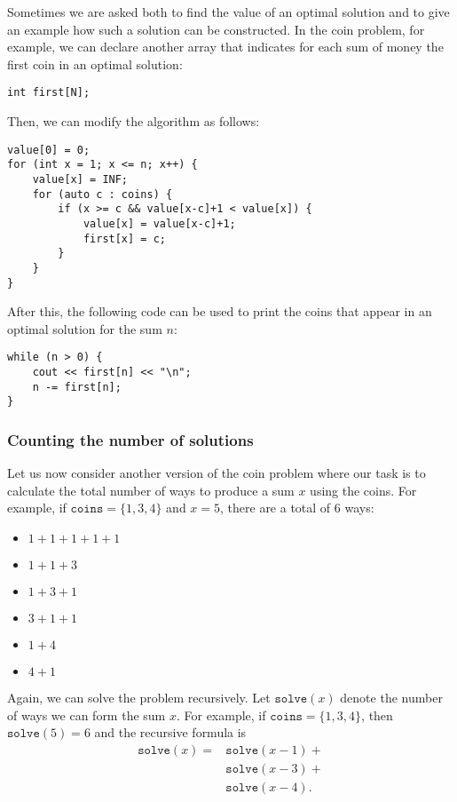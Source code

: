 Sometimes we are asked both to find the value
of an optimal solution and to give
an example how such a solution can be constructed.
In the coin problem, for example,
we can declare another array
that indicates for
each sum of money the first coin 
in an optimal solution:
\begin{lstlisting}
int first[N];
\end{lstlisting}
Then, we can modify the algorithm as follows:
\begin{lstlisting}
value[0] = 0;
for (int x = 1; x <= n; x++) {
    value[x] = INF;
    for (auto c : coins) {
        if (x >= c && value[x-c]+1 < value[x]) {
            value[x] = value[x-c]+1;
            first[x] = c;
        }
    }
}
\end{lstlisting}
After this, the following code can be used to
print the coins that appear in an optimal solution for
the sum $n$:
\begin{lstlisting}
while (n > 0) {
    cout << first[n] << "\n";
    n -= first[n];
}
\end{lstlisting}

\subsubsection{Counting the number of solutions}

Let us now consider another version
of the coin problem where our task is to
calculate the total number of ways
to produce a sum $x$ using the coins.
For example, if $\texttt{coins}=\{1,3,4\}$ and
$x=5$, there are a total of 6 ways:

\begin{multicols}{2}
\begin{itemize}
\item $1+1+1+1+1$
\item $1+1+3$
\item $1+3+1$
\item $3+1+1$
\item $1+4$
\item $4+1$
\end{itemize}
\end{multicols}

Again, we can solve the problem recursively.
Let $\texttt{solve}(x)$ denote the number of ways
we can form the sum $x$.
For example, if $\texttt{coins}=\{1,3,4\}$,
then $\texttt{solve}(5)=6$ and the recursive formula is
\begin{equation*}
\begin{split}
\texttt{solve}(x) = & \texttt{solve}(x-1) + \\
                    & \texttt{solve}(x-3) + \\
                    & \texttt{solve}(x-4)  .
\end{split}
\end{equation*}

